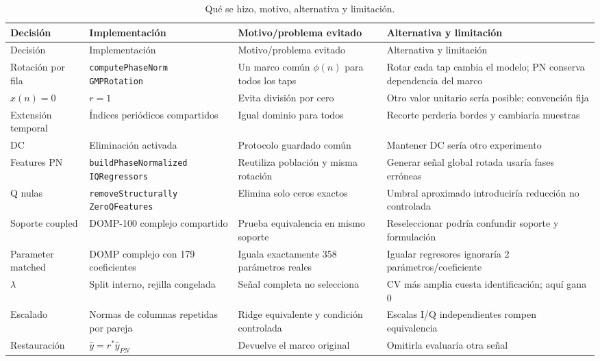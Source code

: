 \documentclass[10pt,a4paper]{article}
\begin{document}
\begin{longtable}{@{}p{.19\linewidth}p{.21\linewidth}p{.25\linewidth}p{.27\linewidth}@{}}
\caption{Qué se hizo, motivo, alternativa y limitación.}\label{tab:decisions}\\
\toprule
Decisión & Implementación & Motivo/problema evitado & Alternativa y limitación\\
\midrule
\endfirsthead
\toprule Decisión & Implementación & Motivo/problema evitado & Alternativa y limitación\\\midrule
\endhead
Rotación por fila & \makecell[l]{\texttt{computePhaseNorm}\\\texttt{GMPRotation}} & Un marco común $\phi(n)$ para todos los taps & Rotar cada tap cambia el modelo; PN conserva dependencia del marco\\
$x(n)=0$ & $r=1$ & Evita división por cero & Otro valor unitario sería posible; convención fija\\
Extensión temporal & Índices periódicos compartidos & Igual dominio para todos & Recorte perdería bordes y cambiaría muestras\\
DC & Eliminación activada & Protocolo guardado común & Mantener DC sería otro experimento\\
Features PN & \makecell[l]{\texttt{buildPhaseNormalized}\\\texttt{IQRegressors}} & Reutiliza población y misma rotación & Generar señal global rotada usaría fases erróneas\\
Q nulas & \makecell[l]{\texttt{removeStructurally}\\\texttt{ZeroQFeatures}} & Elimina solo ceros exactos & Umbral aproximado introduciría reducción no controlada\\
Soporte coupled & DOMP-100 complejo compartido & Prueba equivalencia en mismo soporte & Reseleccionar podría confundir soporte y formulación\\
Parameter matched & DOMP complejo con 179 coeficientes & Iguala exactamente 358 parámetros reales & Igualar regresores ignoraría 2 parámetros/coeficiente\\
$\lambda$ & Split interno, rejilla congelada & Señal completa no selecciona & CV más amplia cuesta identificación; aquí gana 0\\
Escalado & Normas de columnas repetidas por pareja & Ridge equivalente y condición controlada & Escalas I/Q independientes rompen equivalencia\\
Restauración & $\widehat y=r^*\widehat y_{PN}$ & Devuelve el marco original & Omitirla evaluaría otra señal\\

\end{longtable}
\end{document}
